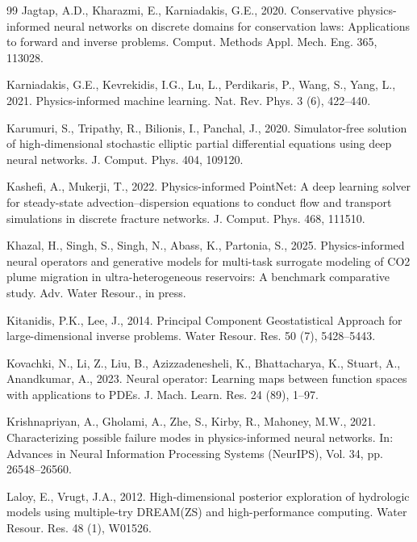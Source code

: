 \documentclass[preprint,12pt,authoryear]{elsarticle}
\begin{document}
\begin{thebibliography}{99}
Jagtap, A.D., Kharazmi, E., Karniadakis, G.E., 2020. Conservative physics-informed neural networks on discrete domains for conservation laws: Applications to forward and inverse problems. Comput. Methods Appl. Mech. Eng. 365, 113028.

Karniadakis, G.E., Kevrekidis, I.G., Lu, L., Perdikaris, P., Wang, S., Yang, L., 2021. Physics-informed machine learning. Nat. Rev. Phys. 3 (6), 422--440.

Karumuri, S., Tripathy, R., Bilionis, I., Panchal, J., 2020. Simulator-free solution of high-dimensional stochastic elliptic partial differential equations using deep neural networks. J. Comput. Phys. 404, 109120.

Kashefi, A., Mukerji, T., 2022. Physics-informed PointNet: A deep learning solver for steady-state advection--dispersion equations to conduct flow and transport simulations in discrete fracture networks. J. Comput. Phys. 468, 111510.

Khazal, H., Singh, S., Singh, N., Abass, K., Partonia, S., 2025. Physics-informed neural operators and generative models for multi-task surrogate modeling of CO2 plume migration in ultra-heterogeneous reservoirs: A benchmark comparative study. Adv. Water Resour., in press.

Kitanidis, P.K., Lee, J., 2014. Principal Component Geostatistical Approach for large-dimensional inverse problems. Water Resour. Res. 50 (7), 5428--5443.

Kovachki, N., Li, Z., Liu, B., Azizzadenesheli, K., Bhattacharya, K., Stuart, A., Anandkumar, A., 2023. Neural operator: Learning maps between function spaces with applications to PDEs. J. Mach. Learn. Res. 24 (89), 1--97.

Krishnapriyan, A., Gholami, A., Zhe, S., Kirby, R., Mahoney, M.W., 2021. Characterizing possible failure modes in physics-informed neural networks. In: Advances in Neural Information Processing Systems (NeurIPS), Vol. 34, pp. 26548--26560.

Laloy, E., Vrugt, J.A., 2012. High-dimensional posterior exploration of hydrologic models using multiple-try DREAM(ZS) and high-performance computing. Water Resour. Res. 48 (1), W01526.


\end{thebibliography}
\end{document}
